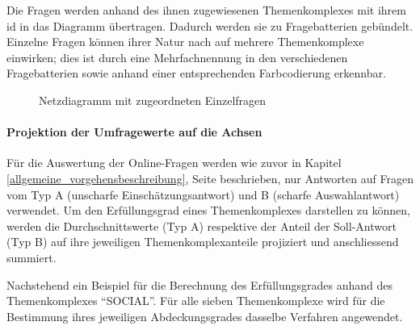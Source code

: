 \documentclass[../../main.tex]{subfiles}
\begin{document}
\begin{sloppypar}
Die Fragen werden anhand des ihnen zugewiesenen Themenkomplexes mit ihrem \acrfull{id} in das Diagramm übertragen. Dadurch werden sie zu Fragebatterien gebündelt. Einzelne Fragen können ihrer Natur nach auf mehrere Themenkomplexe einwirken; dies ist durch eine Mehrfachnennung in den verschiedenen Fragebatterien sowie anhand einer entsprechenden Farbcodierung erkennbar.
\end{sloppypar}

\begin{figure}[H]
 \centering
    
 \caption{Netzdiagramm mit zugeordneten Einzelfragen}
 \label{Netzdiagramm Schema fragepositionen}
\end{figure}

\paragraph*{Projektion der Umfragewerte auf die Achsen}\mbox{}

\begin{sloppypar}
Für die Auswertung der Online-Fragen werden wie zuvor in Kapitel \ref{allgemeine_vorgehensbeschreibung}, Seite \pageref{allgemeine_vorgehensbeschreibung} beschrieben, nur Antworten auf Fragen vom Typ A (unscharfe Einschätzungsantwort) und B (scharfe Auswahlantwort) verwendet. Um den Erfüllungsgrad eines Themenkomplexes darstellen zu können, werden die Durchschnittswerte (Typ A) respektive der Anteil der Soll-Antwort (Typ B) auf ihre jeweiligen Themenkomplexanteile projiziert und anschliessend summiert. 
\end{sloppypar}

\newpage

\begin{sloppypar}
Nachstehend ein Beispiel für die Berechnung des Erfüllungsgrades anhand des Themenkomplexes "`SOCIAL"'. Für alle sieben Themenkomplexe wird für die Bestimmung ihres jeweiligen Abdeckungsgrades dasselbe Verfahren angewendet.\footnotemark
\end{sloppypar}


\end{document}
